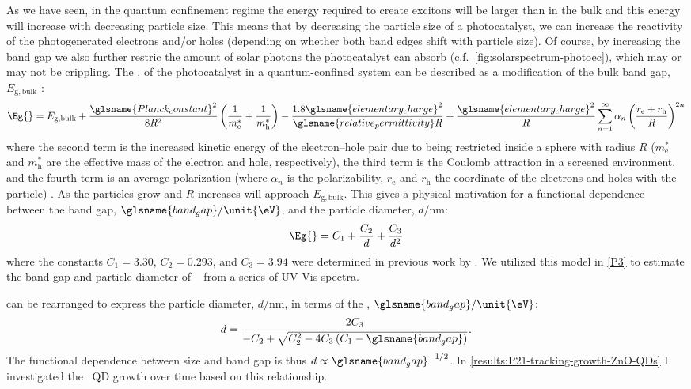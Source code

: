\documentclass[draft,webedition,openright,titles,swedish,english]{LuaUUThesis}\usepackage[]{graphicx}\usepackage[]{xcolor}
\newcommand{\cf}{c.f.}
\begin{document}
As we have seen, in the quantum confinement regime the energy required to create excitons
will be larger than in the bulk and this energy will increase with decreasing particle size.
This means that by decreasing the particle size of a photocatalyst, we
can increase the reactivity of the photogenerated electrons and/or holes (depending
on whether both band edges shift with particle size).
Of course, by increasing the band gap we also further restric the amount of
solar photons the photocatalyst can absorb (\cf\ \cref{fig:solarspectrum-photoec}),
which may or may not be crippling.
%
The , of the photocatalyst in a quantum-confined system can be described as
a modification of the bulk band gap, $E_\mathrm{g,bulk}$ \cite{Edvinsson2018}:
\begin{equation}\label{eq:Eg-quantum-confined}
\Eg{} = E_\mathrm{g,bulk} +
   \frac{\glsname{Planck_constant}^2}{8R^2}\left(\frac{1}{m_\mathrm{e}^\ast} + \frac{1}{m_\mathrm{h}^\ast}\right) -
   \frac{1.8\glsname{elementary_charge}^2}{\glsname{relative_permittivity}R} +
   \frac{\glsname{elementary_charge}^2}{R}\sum_{n=1}^{\infty}\alpha_n\left(\frac{r_\mathrm{e} + r_\mathrm{h}}{R}\right)^{2n}
\end{equation}
where the second term is the increased kinetic energy of the electron--hole pair
due to being restricted inside a sphere with radius $R$
($m_\mathrm{e}^\ast$ and $m_\mathrm{h}^\ast$ are the effective mass of the electron and hole, respectively),
the third term is the Coulomb attraction in a screened environment,
and the fourth term is an average polarization
(where $\alpha_n$ is the polarizability, $r_\mathrm{e}$ and $r_\mathrm{h}$ the coordinate
of the electrons and holes with the particle) \cite{Edvinsson2018}.
As the particles grow and $R$ increases  will approach $E_\mathrm{g,bulk}$.
This gives a physical motivation for a functional dependence between the
band gap, $\glsname{band_gap}/\unit{\eV}$, and the particle diameter, $d/\unit{\nm}$:
\begin{equation}\label{eq:Eg-from-diameter}
\Eg{} = C_1 + \frac{C_2}{d} + \frac{C_3}{d^2}
\end{equation}
where the constants $C_1=\num{3.30}$, $C_2=\num{0.293}$, and $C_3=\num{3.94}$ were
determined in previous work by \textcite{Jacobsson2011}.
We utilized this model in \cref{P3} to estimate the band gap and particle diameter
of \ZnO\  from a series of \gls{UV-Vis} spectra.

 can be rearranged to express the particle diameter, $d/\unit{\nm}$,
in terms of the , $\glsname{band_gap}/\unit{\eV}$:
\begin{equation}\label{eq:diameter-from-Eg}
d = \frac{2C_3}{-C_2 + \sqrt{C_2^2 - 4C_3\left(C_1 - \glsname{band_gap}\right)}}.
\end{equation}
The functional dependence between size and band gap is thus $d\propto\glsname{band_gap}^{-1/2}$.
In \cref{results:P21-tracking-growth-ZnO-QDs} I investigated the \ZnO\ \gls{QD} growth
over time based on this relationship.
\end{document}
